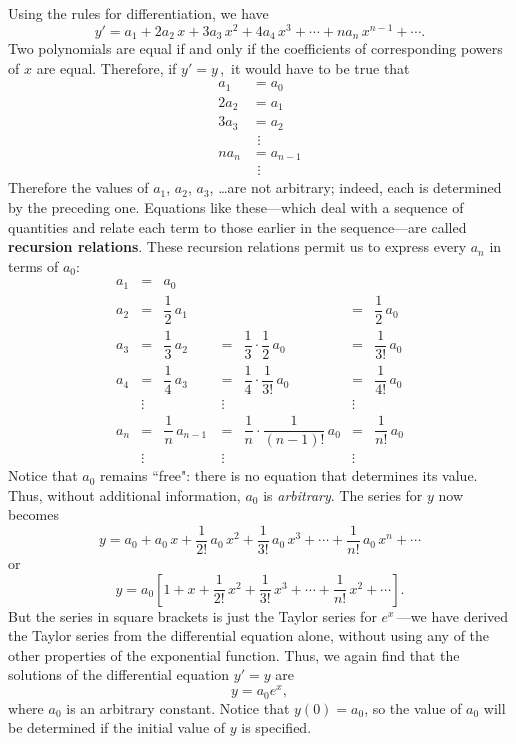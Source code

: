 Using the rules for differentiation, we have
\[
y'= a_1 + 2a_2\,x + 3 a_3\,x^2 + 4 a_4\,x^3 + \cdots 
    + n a_n\,x^{n-1} + \cdots .
\]
Two polynomials are equal if and only if the coefficients of
corresponding powers of $x$ are equal.  Therefore, if $y'=y\,,$ it
would have to be true that
\begin{align*}
a_1   &= a_0 \\
2 a_2 &= a_1 \\
3 a_3 &= a_2 \\[-5pt]
      &\ \, \vdots  \\[-5pt]
n a_n &= a_{n-1} \\[-5pt]
      &\ \, \vdots 
\end{align*}
Therefore the values of $a_1$, $a_2$, $a_3$, \ldots are not arbitrary;
indeed, each is determined by the preceding one.  Equations like
these---which deal with a sequence of quantities and relate each term
to those earlier in the sequence---are called {\bf recursion
  relations}.  These recursion relations
permit us to express every $a_n$ in terms of $a_0$:
\addtolength{\arraycolsep}{-3pt}
\[
\begin{array}{rclclcl}
a_1 &=&  a_0  &&&& \\[3pt]
a_2 &=&  \dfrac{1}{2} \, a_1 & &
         &=& \dfrac{1}{2} \, a_0 \\[10pt]
a_3 &=&  \dfrac{1}{3} \, a_2 &=& \dfrac{1}{3}\cdot \dfrac{1}{2} \, a_0 
         &=& \dfrac{1}{3!} \, a_0 \\[10pt]
a_4 &=&  \dfrac{1}{4} \, a_3 &=& \dfrac{1}{4}\cdot\dfrac{1}{3!} \, a_0 
         &=& \dfrac{1}{4!} \, a_0 \\
    &\vdots& &\vdots& &\vdots&  \\
a_n &=&  \dfrac{1}{n} \, a_{n-1}\ &=& 
         \dfrac{1}{n}\cdot\dfrac{1}{(n-1)!} \, a_0 
         &=& \dfrac{1}{n!} \, a_0 \\[-5pt]
    &\vdots& &\vdots& &\vdots&
\end{array}
\]
Notice that $a_0$ remains ``free": there is no equation that
determines its value.  Thus, without additional information, $a_0$ is
{\em arbitrary}.  The series for $y$ now becomes
\[
y = a_0 + a_0\, x + \dfrac{1}{2!} \, a_0 \,x^2 + \dfrac{1}{3!} \, a_0 \,x^3 
   + \cdots + \dfrac{1}{n!} \, a_0 \,x^n + \cdots
\]
or
\[
y = a_0\left[1 + x + \dfrac{1}{2!} \, x^2 + \dfrac{1}{3!} \, x^3 + \cdots +
\dfrac{1}{n!} \, x^2 + \cdots \right].
\]
But the series in square brackets is just the Taylor series for $e^x
\,$---we have derived the Taylor series from the differential equation
alone, without using any of the other properties of the exponential
function.  Thus, we again find that the solutions of the differential
equation $y'=y$ are
\[
y=a_0e^x,
\]
where $a_0$ is an arbitrary constant.  Notice that $y(0)=a_0$, so the
value of $a_0$ will be determined if the initial value of $y$ is
specified.


